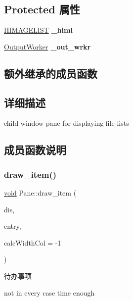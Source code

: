 \subsection*{Protected 属性}
\begin{DoxyCompactItemize}
\item 
\mbox{\label{struct_pane_aec00f4665bbef2da43f52bc98bf9f2d9}} 
\hyperlink{struct___i_m_a_g_e_l_i_s_t}{H\+I\+M\+A\+G\+E\+L\+I\+ST} {\bfseries \+\_\+himl}
\item 
\mbox{\label{struct_pane_a9f10bf801c13930c3dfb2f6e151b290a}} 
\hyperlink{struct_output_worker}{Output\+Worker} {\bfseries \+\_\+out\+\_\+wrkr}
\end{DoxyCompactItemize}
\subsection*{额外继承的成员函数}


\subsection{详细描述}
child window pane for displaying file lists 

\subsection{成员函数说明}
\mbox{\label{struct_pane_a75554c9e14ed5de1efc75a5e9da6b6b9}} 
\subsubsection{\texorpdfstring{draw\+\_\+item()}{draw\_item()}}
{\footnotesize\ttfamily \hyperlink{interfacevoid}{void} Pane\+::draw\+\_\+item (\begin{DoxyParamCaption}\item[{\hyperlink{structtag_d_r_a_w_i_t_e_m_s_t_r_u_c_t}{L\+P\+D\+R\+A\+W\+I\+T\+E\+M\+S\+T\+R\+U\+CT}}]{dis,  }\item[{\hyperlink{struct_entry}{Entry} $\ast$}]{entry,  }\item[{int}]{calc\+Width\+Col = {\ttfamily -\/1} }\end{DoxyParamCaption})}

\begin{DoxyRefDesc}{待办事项}
\item[\hyperlink{todo__todo000042}{待办事项}]not in every case time enough \end{DoxyRefDesc}


